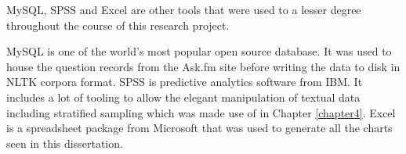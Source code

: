 MySQL, SPSS and Excel are other tools that were used to a lesser degree throughout the course of this research project.

MySQL is one of the world's most popular open source database. It was used to house the question records from the Ask.fm site before writing the data to disk in NLTK corpora format. SPSS is predictive analytics software from IBM. It includes a lot of tooling to allow the elegant manipulation of textual data including stratified sampling which was made use of in Chapter \ref{chapter4}. Excel is a spreadsheet package from Microsoft that was used to generate all the charts seen in this dissertation.











